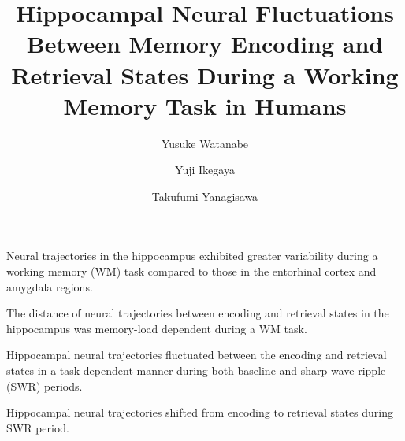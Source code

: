 \documentclass[preprint,review,12pt]{elsarticle}%
\begin{document}
\begin{frontmatter}
\begin{highlights}

\item Neural trajectories in the hippocampus exhibited greater variability during a working memory (WM) task compared to those in the entorhinal cortex and amygdala regions.

\item The distance of neural trajectories between encoding and retrieval states in the hippocampus was memory-load dependent during a WM task.


\item Hippocampal neural trajectories fluctuated between the encoding and retrieval states in a task-dependent manner during both baseline and sharp-wave ripple (SWR) periods.

\item Hippocampal neural trajectories shifted from encoding to retrieval states during SWR period.

\end{highlights}\title{
Hippocampal Neural Fluctuations Between Memory Encoding and Retrieval States During a Working Memory Task in Humans
}\author[1]{Yusuke Watanabe}
\author[2,3,4]{Yuji Ikegaya}
\author[1,5]{Takufumi Yanagisawa}

\address[1]{Institute for Advanced Cocreation studies, Osaka University, 2-2 Yamadaoka, Suita, 565-0871, Osaka, Japan}
\address[2]{Graduate School of Pharmaceutical Sciences, The University of Tokyo, 7-3-1 Hongo, Tokyo, 113-0033, Japan}
\address[3]{Institute for AI and Beyond, The University of Tokyo, 7-3-1 Hongo, Tokyo, 113-0033, Japan}
\address[4]{Center for Information and Neural Networks, National Institute of Information and Communications Technology, 1-4 Yamadaoka, Suita City, 565-0871, Osaka, Japan}
\address[5]{Department of Neurosurgery, Osaka University Graduate School of Medicine, 2-2 Yamadaoka, Osaka, 565-0871, Japan}



\end{frontmatter}
\end{document}

